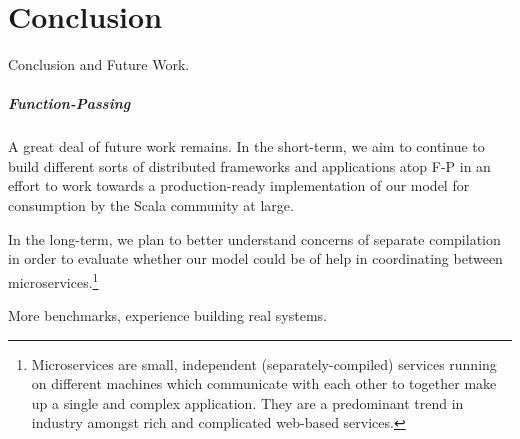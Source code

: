 \chapter*{Conclusion}

Conclusion and Future Work.

\paragraph{Function-Passing} A great deal of future work remains. In the
short-term, we aim to continue to build different sorts of distributed
frameworks and applications atop F-P in an effort to work towards a
production-ready implementation of our model for consumption by the Scala
community at large.

In the long-term, we plan to better understand concerns of separate compilation
in order to evaluate whether our model could be of help in coordinating between
microservices.\footnote{Microservices are small, independent
(separately-compiled) services running on different machines which communicate
with each other to together make up a single and complex application. They are a
predominant trend in industry amongst rich and complicated web-based services.}

More benchmarks, experience building real systems.
